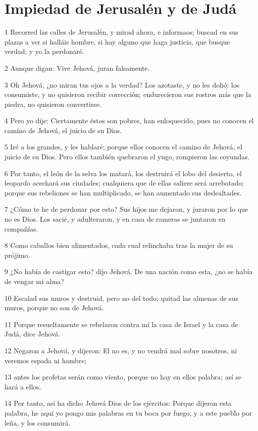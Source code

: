 \section*{Impiedad de Jerusalén y de Judá}

\par 1 Recorred las calles de Jerusalén, y mirad ahora, e informaos; buscad en sus plazas a ver si halláis hombre, si hay alguno que haga justicia, que busque verdad; y yo la perdonaré.
\par 2 Aunque digan: Vive Jehová, juran falsamente.
\par 3 Oh Jehová, ¿no miran tus ojos a la verdad? Los azotaste, y no les dolió; los consumiste, y no quisieron recibir corrección; endurecieron sus rostros más que la piedra, no quisieron convertirse.
\par 4 Pero yo dije: Ciertamente éstos son pobres, han enloquecido, pues no conocen el camino de Jehová, el juicio de su Dios.
\par 5 Iré a los grandes, y les hablaré; porque ellos conocen el camino de Jehová, el juicio de su Dios. Pero ellos también quebraron el yugo, rompieron las coyundas.
\par 6 Por tanto, el león de la selva los matará, los destruirá el lobo del desierto, el leopardo acechará sus ciudades; cualquiera que de ellas saliere será arrebatado; porque sus rebeliones se han multiplicado, se han aumentado sus deslealtades.
\par 7 ¿Cómo te he de perdonar por esto? Sus hijos me dejaron, y juraron por lo que no es Dios. Los sacié, y adulteraron, y en casa de rameras se juntaron en compañías.
\par 8 Como caballos bien alimentados, cada cual relinchaba tras la mujer de su prójimo.
\par 9 ¿No había de castigar esto? dijo Jehová. De una nación como esta, ¿no se había de vengar mi alma?
\par 10 Escalad sus muros y destruid, pero no del todo; quitad las almenas de sus muros, porque no son de Jehová.
\par 11 Porque resueltamente se rebelaron contra mí la casa de Israel y la casa de Judá, dice Jehová.
\par 12 Negaron a Jehová, y dijeron: El no es, y no vendrá mal sobre nosotros, ni veremos espada ni hambre;
\par 13 antes los profetas serán como viento, porque no hay en ellos palabra; así se hará a ellos.
\par 14 Por tanto, así ha dicho Jehová Dios de los ejércitos: Porque dijeron esta palabra, he aquí yo pongo mis palabras en tu boca por fuego, y a este pueblo por leña, y los consumirá.
